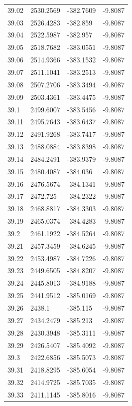 \begin{table}[H]
\begin{tabular}{llll}
39.02 & 2530.2569 & -382.7609 & -9.8087 \\
39.03 & 2526.4283 & -382.859 & -9.8087 \\
39.04 & 2522.5987 & -382.957 & -9.8087 \\
39.05 & 2518.7682 & -383.0551 & -9.8087 \\
39.06 & 2514.9366 & -383.1532 & -9.8087 \\
39.07 & 2511.1041 & -383.2513 & -9.8087 \\
39.08 & 2507.2706 & -383.3494 & -9.8087 \\
39.09 & 2503.4361 & -383.4475 & -9.8087 \\
39.1 & 2499.6007 & -383.5456 & -9.8087 \\
39.11 & 2495.7643 & -383.6437 & -9.8087 \\
39.12 & 2491.9268 & -383.7417 & -9.8087 \\
39.13 & 2488.0884 & -383.8398 & -9.8087 \\
39.14 & 2484.2491 & -383.9379 & -9.8087 \\
39.15 & 2480.4087 & -384.036 & -9.8087 \\
39.16 & 2476.5674 & -384.1341 & -9.8087 \\
39.17 & 2472.725 & -384.2322 & -9.8087 \\
39.18 & 2468.8817 & -384.3303 & -9.8087 \\
39.19 & 2465.0374 & -384.4283 & -9.8087 \\
39.2 & 2461.1922 & -384.5264 & -9.8087 \\
39.21 & 2457.3459 & -384.6245 & -9.8087 \\
39.22 & 2453.4987 & -384.7226 & -9.8087 \\
39.23 & 2449.6505 & -384.8207 & -9.8087 \\
39.24 & 2445.8013 & -384.9188 & -9.8087 \\
39.25 & 2441.9512 & -385.0169 & -9.8087 \\
39.26 & 2438.1 & -385.115 & -9.8087 \\
39.27 & 2434.2479 & -385.213 & -9.8087 \\
39.28 & 2430.3948 & -385.3111 & -9.8087 \\
39.29 & 2426.5407 & -385.4092 & -9.8087 \\
39.3 & 2422.6856 & -385.5073 & -9.8087 \\
39.31 & 2418.8295 & -385.6054 & -9.8087 \\
39.32 & 2414.9725 & -385.7035 & -9.8087 \\
39.33 & 2411.1145 & -385.8016 & -9.8087 \\

\end{tabular}
\end{table}
